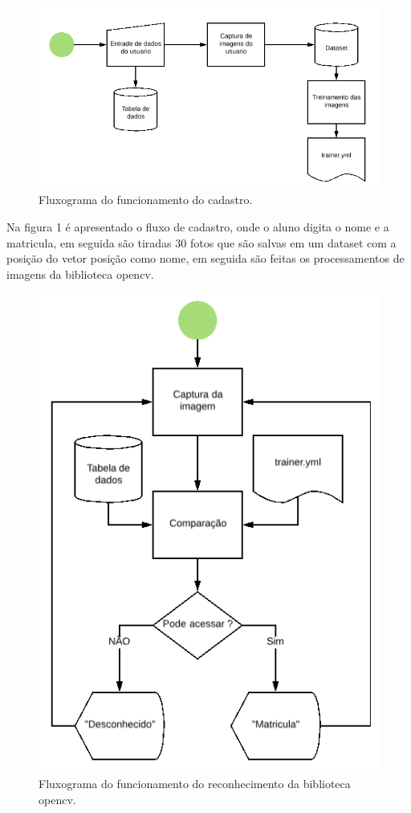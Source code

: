 \documentclass[conference,compsoc]{IEEEtran}
\begin{document}
\begin{figure}[!ht]
		\centering
		\includegraphics[scale=0.25]{Cadastro.png}
		\caption{Fluxograma do funcionamento do cadastro.}
\end{figure}

Na figura 1 é apresentado o fluxo de cadastro, onde o aluno digita o nome e a matricula, em seguida são tiradas 30 fotos que são salvas em um dataset com a posição do vetor posição como nome, em seguida são feitas os processamentos de imagens da biblioteca opencv.

\begin{figure}[!ht]
		\centering
		\includegraphics[scale=0.25]{Reconehcimento.png}
		\caption{Fluxograma do funcionamento do reconhecimento da biblioteca opencv.}
\end{figure}
\end{document}

